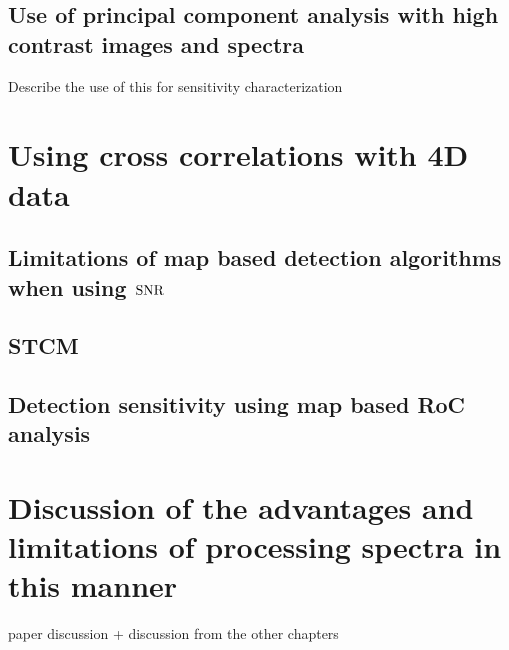 \section{Use of principal component analysis with high contrast images and spectra}
Describe the use of this for sensitivity characterization
\chapter{Using cross correlations with 4D data}
\section{Limitations of map based detection algorithms when using $\rm{SNR}$}
\section{STCM}
\section{Detection sensitivity using map based RoC analysis}
\chapter{Discussion of the advantages and limitations of processing spectra in this manner}
paper discussion + discussion from the other chapters
